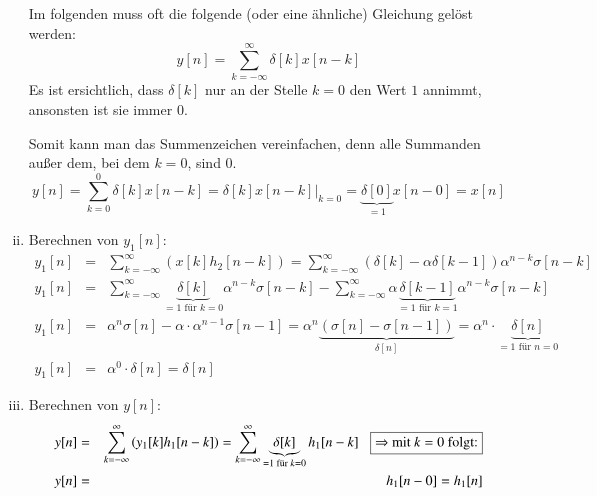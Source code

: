 \begin{uebsp}
\begin{Answer}
\begin{enumerate}[i)]
\begin{center}
            \end{center}
            \begin{uebsp_theory}
                Im folgenden muss oft die folgende (oder eine ähnliche) Gleichung gelöst werden:
                \[y[n]=\sum_{k=-\infty}^\infty\delta[k]x[n-k]\]
                Es ist ersichtlich, dass $\delta[k]$ nur an der Stelle $k=0$ den Wert $1$ annimmt, ansonsten ist sie immer $0$.

                Somit kann man das Summenzeichen vereinfachen, denn alle Summanden außer dem, bei dem $k=0$, sind 0.
                \[y[n]=\sum_{k=0}^0\delta[k]x[n-k]=\left.\delta[k]x[n-k]\right|_{k=0}=\underbrace{\delta[0]}_{=1}x[n-0]=x[n]\]
            \end{uebsp_theory}
        \item Berechnen von $y_1[n]$:
            \begin{eqnarray*}
                y_1[n] &=& \sum_{k=-\infty}^{\infty}\left(x[k]h_2[n-k]\right)=
                \sum_{k=-\infty}^{\infty}\left(\delta[k] - \alpha \delta[k - 1]\right)\alpha^{n-k}\sigma[n-k]\\
                y_1[n] &=& \sum_{k=-\infty}^{\infty}\underbrace{\delta[k]}_{=1\text{ für } k=0}\alpha^{n-k}\sigma[n-k] -\sum_{k=-\infty}^{\infty} \alpha \underbrace{\delta[k - 1]}_{=1\text{ für } k=1}\alpha^{n-k}\sigma[n-k]\\
                y_1[n] &=& \alpha^n\sigma[n]-\alpha\cdot\alpha^{n-1}\sigma[n-1] = \alpha^n\underbrace{(\sigma[n]-\sigma[n-1])}_{\delta[n]}=\alpha^n\cdot \underbrace{\delta[n]}_{=1\text{ für }n=0}\\
                y_1[n] &=& \alpha^0\cdot \delta[n] = \delta[n]
            \end{eqnarray*}
        \item Berechnen von $y[n]$:
            \begin{eqnarray*}
                y[n] &=& \sum_{k=-\infty}^{\infty}\left(y_1[k]h_1[n-k]\right)=
                \sum_{k=-\infty}^{\infty}\underbrace{\delta[k]}_{=1\text{ für }k=0}h_1[n-k]\;\;\;\fbox{$\Rightarrow$ mit $k=0$ folgt:}\\
                y[n] &=&h_1[n-0]=h_1[n]\\
            \end{eqnarray*}
    \end{enumerate}
\end{Answer}
\end{uebsp}
